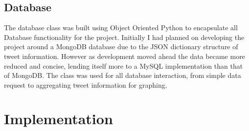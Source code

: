 \documentclass[12pt,a4paper]{report}
\begin{document}
  \section{Database}
  The database class was built using Object Oriented Python to encapsulate all Database functionality for the project. Initially I had planned on developing the project around a MongoDB database due to the JSON dictionary structure of tweet information. However as development moved ahead the data became more reduced and concise, lending itself more to a MySQL implementation than that of MongoDB. The class was used for all database interaction, from simple data request to aggregating tweet information for graphing.

\chapter{Implementation}
\end{document}
